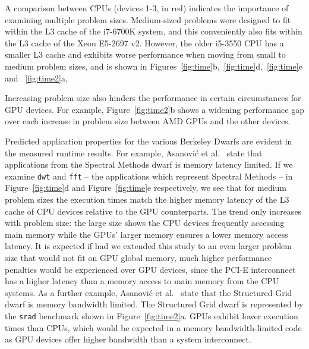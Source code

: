 \documentclass[../document.tex]{subfiles}
\begin{document}
A comparison between CPUs (devices 1-3, in red) indicates the importance of examining multiple problem sizes.
Medium-sized problems were designed to fit within the L3 cache of the i7-6700K system, and this conveniently also fits within the L3 cache of the Xeon E5-2697 v2.
However, the older i5-3550 CPU has a smaller L3 cache and exhibits worse performance when moving from small to medium problem sizes, and is shown in Figures~\ref{fig:time}b,~\ref{fig:time}d,~\ref{fig:time}e and ~\ref{fig:time2}a,

Increasing problem size also hinders the performance in certain circumstances for GPU devices.
For example, Figure~\ref{fig:time2}b shows a widening performance gap over each increase in problem size between AMD GPUs and the other devices.

Predicted application properties for the various Berkeley Dwarfs are evident in the measured runtime results.
For example, Asanovi\'{c} et al.~\cite{asanovic2006landscape} state that applications from the Spectral Methods dwarf is memory latency limited.
If we examine {\tt dwt} and {\tt fft} -- the applications which represent Spectral Methods -- in Figure~\ref{fig:time}d and Figure~\ref{fig:time}e respectively, we see that for medium problem sizes the execution times match the higher memory latency of the L3 cache of CPU devices relative to the GPU counterparts.
The trend only increases with problem size: the large size shows the CPU devices frequently accessing main memory while the GPUs' larger memory ensures a lower memory access latency.
It is expected if had we extended this study to an even larger problem size that would not fit on GPU global memory, much higher performance penalties would be experienced over GPU devices, since the PCI-E interconnect has a higher latency than a memory access to main memory from the CPU systems.
As a further example, Asanovi\'{c} et al.~\cite{asanovic2006landscape} state that the Structured Grid dwarf is memory bandwidth limited.
The Structured Grid dwarf is represented by the {\tt srad} benchmark shown in Figure~\ref{fig:time2}a.
GPUs exhibit lower execution times than CPUs, which would be expected in a memory bandwidth-limited code as GPU devices offer higher bandwidth than a system interconnect.

\end{document}
